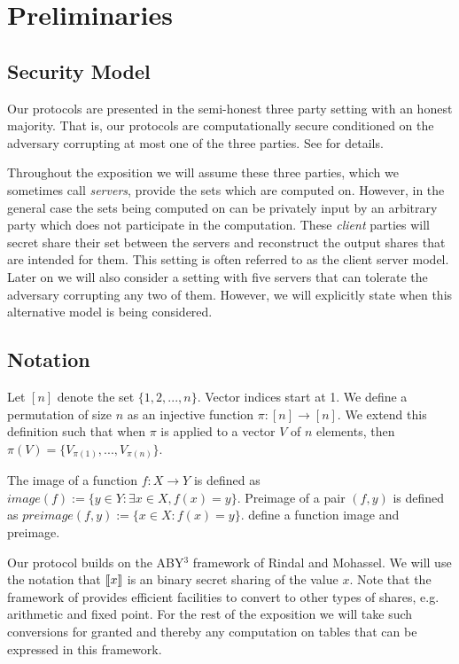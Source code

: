 \section{Preliminaries} \label{sec:prelim}


\subsection{Security Model}

Our protocols are presented in the semi-honest three party setting with an honest majority. That is, our protocols are computationally secure conditioned on the adversary corrupting at most one of the three parties. See \cite{highthroughput,aby3} for details.


\iffullversion
Throughout the exposition we will assume these three parties, which we sometimes call \emph{servers}, provide the sets which are computed on. However, in the general case the sets being computed on can be privately input by an arbitrary party which does not participate in the computation. These \emph{client} parties will secret share their set between the servers and reconstruct the output shares that are intended for them. This setting is often referred to as the client server model\cite{aby3, secureML}. Later on we will also consider a setting with five servers that can tolerate the adversary corrupting any two of them. However, we will explicitly state when this alternative model is being considered.
\fi


\subsection{Notation}




Let $[n]$ denote the set $\{1,2,...,n\}$. Vector indices start at 1.
We define a permutation of size $n$ as an injective function $\pi : [n] \rightarrow [n]$. We extend this definition such that when $\pi$ is applied to a vector $V$ of $n$ elements, then  $\pi(V)=\{V_{\pi(1)}, ..., V_{\pi(n)}\}$. 

The image of a function $f : X \rightarrow Y$ is defined as $image(f) := \{y\in Y : \exists x\in X, f(x)=y\}$. Preimage of a pair $(f,y)$ is defined as $preimage(f,y):=\{x\in X : f(x) = y\}$.
define a function image and preimage.



Our protocol builds on the ABY$^3$ framework of Rindal and Mohassel\cite{aby3}. We will use the notation that $\llbracket x\rrbracket$ is an binary secret sharing of the value $x$. Note that the framework of \cite{aby3} provides efficient facilities to convert to other types of shares, e.g. arithmetic and fixed point. For the rest of the exposition we will take such conversions for granted and thereby any computation on tables that can be expressed in this framework.

